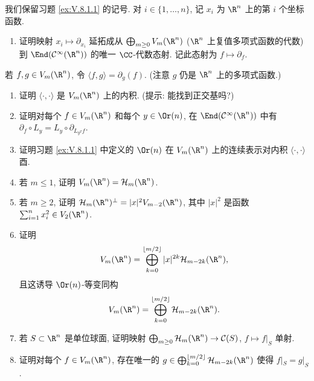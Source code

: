 \begin{exercise}[调和多项式的内积]
\label{ex:V.8.1.2}
我们保留习题 \ref{ex:V.8.1.1} 的记号. 对 $i \in \{1, \ldots, n\}$, 记 $x_i$ 为 $\R^n$ 上的第 $i$ 个坐标函数.
\begin{enumerate}
\item[(a)] 证明映射 $x_i \longmapsto \partial_{x_i}$ 延拓成从 $\bigoplus_{m \geq 0}V_m(\R^n)$ ($\R^n$ 上复值多项式函数的代数) 到 $\End(\mathcal{C}^{\infty}(\R^n))$ 的唯一 $\CC$-代数态射. 记此态射为 $f \longmapsto \partial_f$.
\end{enumerate}
若 $f, g \in V_m(\R^n)$, 令 $\langle f, g \rangle = \partial_g(f)$. (注意 $g$ 仍是 $\R^n$ 上的多项式函数.)
\begin{enumerate}
\item[(a)] 证明 $\langle \cdot, \cdot \rangle$ 是 $V_m(\R^n)$ 上的内积. (提示: 能找到正交基吗?)
\item[(b)] 证明对每个 $f \in V_m(\R^n)$ 和每个 $y \in \Or(n)$, 在 $\End(\mathcal{C}^{\infty}(\R^n))$ 中有 $\partial_f \circ L_y = L_y \circ \partial_{L_{y^T}f}$.
\item[(c)] 证明习题 \ref{ex:V.8.1.1} 中定义的 $\Or(n)$ 在 $V_m(\R^n)$ 上的连续表示对内积 $\langle \cdot, \cdot \rangle$ 酉.
\item[(d)] 若 $m \leq 1$, 证明 $V_m(\R^n) = \mathcal{H}_m(\R^n)$.
\item[(e)] 若 $m \geq 2$, 证明 $\mathcal{H}_m(\R^n)^{\perp} = |x|^2V_{m-2}(\R^n)$, 其中 $|x|^2$ 是函数 $\sum_{i=1}^n x_i^2 \in V_2(\R^n)$.
\item[(f)] 证明
\[
V_m(\R^n) = \bigoplus_{k=0}^{\lfloor m/2 \rfloor}|x|^{2k}\mathcal{H}_{m-2k}(\R^n),
\]
且这诱导 $\Or(n)$-等变同构
\[
V_m(\R^n) = \bigoplus_{k=0}^{\lfloor m/2 \rfloor}\mathcal{H}_{m-2k}(\R^n).
\]
\item[(g)] 若 $S \subset \R^n$ 是单位球面, 证明映射 $\bigoplus_{m \geq 0}\mathcal{H}_m(\R^n) \to \mathcal{C}(S)$, $f \longmapsto f|_S$ 单射.
\item[(h)] 证明对每个 $f \in V_m(\R^n)$, 存在唯一的 $g \in \bigoplus_{k=0}^{\lfloor m/2 \rfloor}\mathcal{H}_{m-2k}(\R^n)$ 使得 $f|_S = g|_S$.
\end{enumerate}
\end{exercise}

